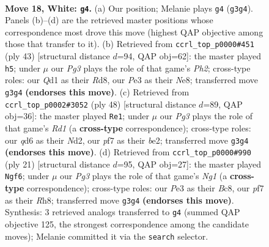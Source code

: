 \documentclass[11pt]{article}
\begin{document}
\begin{figure}[p]\centering
\begin{subfigure}{0.46\textwidth}\centering
\resizebox{\linewidth}{!}{%
\newchessgame
\chessboard[
  setfen={r1b1r3/1pp2pkp/2nq1b2/p2p4/3P4/NP2P1P1/P4P2/RNBQRK2 w - - 1 18},
  showmover=false,
  pgfstyle=straightmove, color=movearrow, markmove={g3-g4}
]}
\caption{}
\end{subfigure}\hfill
\begin{subfigure}{0.46\textwidth}\centering
\resizebox{\linewidth}{!}{%
\newchessgame
\chessboard[
  setfen={3rnrk1/4qp1p/p1bp2p1/1p6/4PQB1/P1NR3P/1PP3P1/5R1K b - - 0 22},
  showmover=false,
  pgfstyle=straightmove, color=movearrow, markmove={h7-h5}
]}
\caption{}
\end{subfigure}
\\[4pt]
\begin{subfigure}{0.46\textwidth}\centering
\resizebox{\linewidth}{!}{%
\newchessgame
\chessboard[
  setfen={r1r2bk1/2p2pp1/1p5p/1q1p4/3P4/PPB1P3/1Q1NbPPP/R2R2K1 w - - 4 25},
  showmover=false,
  pgfstyle=straightmove, color=movearrow, markmove={d1-e1}
]}
\caption{}
\end{subfigure}\hfill
\begin{subfigure}{0.46\textwidth}\centering
\resizebox{\linewidth}{!}{%
\newchessgame
\chessboard[
  setfen={r1b1k1nr/pp1nqppp/2p5/4p1Q1/2B1P3/1NP5/PP3PPP/R1B1K2R b KQkq - 0 11},
  showmover=false,
  pgfstyle=straightmove, color=movearrow, markmove={g8-f6}
]}
\caption{}
\end{subfigure}
\caption{\textbf{Move 18, White: \texttt{g4}.} (a) Our position; Melanie plays \texttt{g4} (\texttt{g3g4}). Panels (b)--(d) are the retrieved master positions whose correspondence most drove this move (highest QAP objective among those that transfer to it). (b) Retrieved from \texttt{ccrl\_top\_p0000\#451} (ply 43) [structural distance $d$=94, QAP obj=62]: the master played \texttt{h5}; under $\mu$ our \emph{Pg3} plays the role of that game's \emph{Ph2}; cross-type roles: our \emph{Q}d1 as their \emph{R}d8, our \emph{P}e3 as their \emph{N}e8; transferred move \texttt{g3g4} \textbf{(endorses this move)}. (c) Retrieved from \texttt{ccrl\_top\_p0002\#3052} (ply 48) [structural distance $d$=89, QAP obj=36]: the master played \texttt{Re1}; under $\mu$ our \emph{Pg3} plays the role of that game's \emph{Rd1} (a \textbf{cross-type} correspondence); cross-type roles: our \emph{q}d6 as their \emph{N}d2, our \emph{p}f7 as their \emph{b}e2; transferred move \texttt{g3g4} \textbf{(endorses this move)}. (d) Retrieved from \texttt{ccrl\_top\_p0000\#990} (ply 21) [structural distance $d$=95, QAP obj=27]: the master played \texttt{Ngf6}; under $\mu$ our \emph{Pg3} plays the role of that game's \emph{Ng1} (a \textbf{cross-type} correspondence); cross-type roles: our \emph{P}e3 as their \emph{B}c8, our \emph{p}f7 as their \emph{R}h8; transferred move \texttt{g3g4} \textbf{(endorses this move)}. Synthesis: 3 retrieved analogs transferred to \texttt{g4} (summed QAP objective 125, the strongest correspondence among the candidate moves); Melanie committed it via the \texttt{search} selector.}
\label{fig:thought-m34}
\end{figure}
\end{document}
